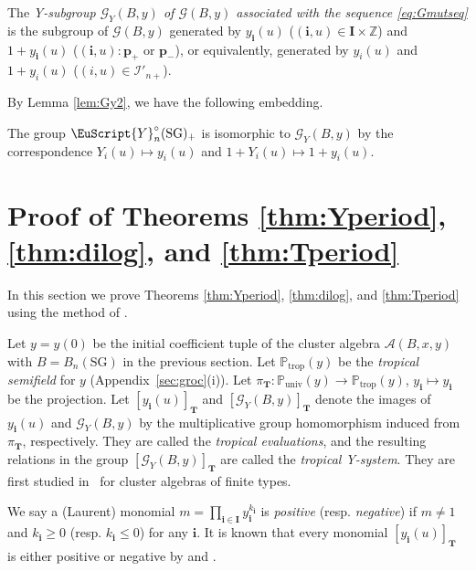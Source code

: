 \begin{Definition}
The {\em Y-subgroup
$\mathcal{G}_Y(B,y)$
of $\mathcal{G}(B,y)$
associated with the sequence \eqref{eq:Gmutseq}}
is the subgroup of
$\mathcal{G}(B,y)$
generated by
$y_{\mathbf{i}}(u)$
($(\mathbf{i},u)\in \mathbf{I}\times \mathbb{Z}$)
and $1+y_{\mathbf{i}}(u)$
($(\mathbf{i},u):\mathbf{p}_+$ or $\mathbf{p}_-$),
or equivalently,
generated by
$y_i(u)$ and $1+y_i(u)$
($(i,u)\in \mathcal{I}'_{n+}$).
\end{Definition}

By Lemma \ref{lem:Gy2}, we have the following embedding.
\begin{Theorem}
\label{thm:GYiso}
The group $\EuScript{Y}^{\circ}_{n}(\mathrm{SG})_+$ is isomorphic to
$\mathcal{G}_Y(B,y)$ by the correspondence
$Y_i(u)\mapsto y_i(u)$
and $1+Y_i(u)\mapsto 1+y_i(u)$.
\end{Theorem}


\section{Proof of
Theorems \ref{thm:Yperiod}, \ref{thm:dilog},
and \ref{thm:Tperiod}}
\label{sec:proofSG}

In this section we prove
Theorems \ref{thm:Yperiod}, \ref{thm:dilog},
and \ref{thm:Tperiod}
using the method of \cite{Nakanishi09,Inoue10a}.


Let $y=y(0)$ be the initial coef\/f\/icient tuple
of the cluster algebra $\mathcal{A}(B,x,y)$
with $B=B_{n}(\mathrm{SG})$ in the previous section.
Let
$\mathbb{P}_{\mathrm{trop}}(y)$ be
the {\em tropical semifield} for $y$ (Appendix~\ref{sec:groc}(i)).
Let $\pi_{\mathbf{T}}:
\mathbb{P}_{\mathrm{univ}}(y)\rightarrow
\mathbb{P}_{\mathrm{trop}}(y)$, $y_{\mathbf{i}}\mapsto
y_{\mathbf{i}}$ be the projection.
Let $[y_{\mathbf{i}}(u)]_{\mathbf{T}}$
and $[\mathcal{G}_Y(B,y)]_{\mathbf{T}}$
denote the images of $y_{\mathbf{i}}(u)$
and $\mathcal{G}_Y(B,y)$
by the multiplicative group
 homomorphism induced from $\pi_{\mathbf{T}}$, respectively.
They are called the {\em tropical evaluations},
and the resulting relations in
the group $[\mathcal{G}_Y(B,y)]_{\mathbf{T}}$
are called the {\em tropical Y-system}.
They are f\/irst studied in~\cite{Fomin03b}
for cluster algebras of f\/inite types.

We say a (Laurent) monomial $m=\prod_{\mathbf{i}\in \mathbf{I}}
y_{\mathbf{i}}^{k_{\mathbf{i}}}$
is {\em positive} (resp. {\em negative})
if $m\neq 1$ and $k_{\mathbf{i}}\geq 0$
(resp. $k_{\mathbf{i}}\leq 0$)
for any $\mathbf{i}$.
It is known that every monomial $[y_{\mathbf{i}}(u)]_{\mathbf{T}}$
is either positive or negative by \cite[Proposition 5.6]{Fomin07}
and \cite[Theorem 1.7]{Derksen10}.

